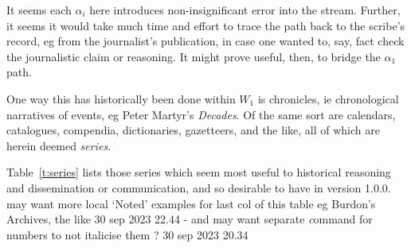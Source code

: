 \documentclass{amsart}%
\newcommand{\titleit}[1]{\textit{#1}}%
\newcommand{\mention}[1]{\textit{#1}}%
\theoremstyle{plain}
\theoremstyle{definition}
\theoremstyle{remark}
\theoremstyle{definition}
\theoremstyle{remark}
\begin{document}
It seems each \(\alpha_i\) here introduces non-insignificant error into the stream. %
Further, it seems it would take much time and effort to trace the path back to the scribe's record, eg from the journalist's publication, in case one wanted to, say, fact check the journalistic claim or reasoning. It might prove useful, then, to bridge the \(\alpha_1\) path.%

One way this has historically been done within \(W_1\) is chronicles, ie chronological narratives of events, eg Peter Martyr's \titleit{Decades}. %
Of the same sort are calendars, catalogues, compendia, dictionaries, gazetteers, and the like, all of which are herein deemed \mention{series}.%

Table~\ref{t:series} lists those series which seem most useful to historical reasoning and dissemination or communication, and so desirable to have in version 1.0.0.
 may want more local `Noted' examples for last col of this table eg Burdon's Archives, the like 30 sep 2023 22.44 - and may want separate \mention command for numbers to not italicise them ? 30 sep 2023 20.34
%
%
%
%
%
\end{document}
